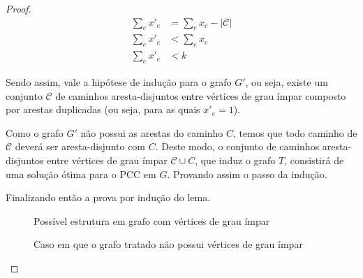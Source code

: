 \documentclass[12pt, a4paper]{article}
\begin{document}
\begin{proof}
    \begin{align*}
        \sum_e x'_e &= \sum_e x_e - |\mathcal{C}| \\ 
        \sum_e x'_e &< \sum_e x_e \\
        \sum_e x'_e &< k
    \end{align*}

    Sendo assim, vale a hipótese de indução para o grafo $G'$, ou seja, existe um conjunto $\mathcal{C}$ de caminhos aresta-disjuntos entre vértices de grau ímpar composto por arestas duplicadas (ou seja, para as quais $x'_e = 1$).

    Como o grafo $G'$ não possui as arestas do caminho $C$, temos que todo caminho de $\mathcal{C}$ deverá ser aresta-disjunto com $C$.
    Deste modo, o conjunto de caminhos aresta-disjuntos entre vértices de grau ímpar $\mathcal{C} \cup C$, que induz o grafo $T$, consistirá de uma solução ótima para o PCC em $G$.
    Provando assim o passo da indução.

    Finalizando então a prova por indução do lema.

    \begin{figure}
        \centering
        \caption{Possível estrutura em grafo com vértices de grau ímpar}
        \label{pcc-case1}
    \end{figure}
    \begin{figure}
        \centering
        \caption{Caso em que o grafo tratado não possui vértices de grau ímpar}
        \label{pcc-case2}
    \end{figure}

\end{proof}
\end{document}
